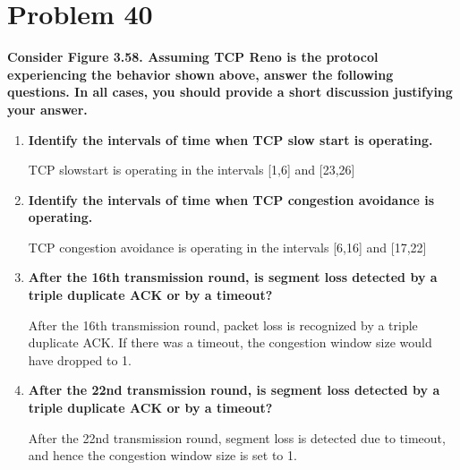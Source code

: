 \documentclass[11pt]{article}
\newenvironment{qparts}{\begin{enumerate}[{(}a{)}]}{\end{enumerate}}
\begin{document}
\newpage
\section{Problem 40}

\textbf{Consider Figure 3.58. Assuming TCP Reno is the protocol experiencing the behavior shown above, answer the following questions. In all cases, you should provide a short discussion justifying your answer.}

\begin{qparts}
	\item \textbf{Identify the intervals of time when TCP slow start is operating.}

	TCP slowstart is operating in the intervals [1,6] and [23,26]
	
	\item \textbf{Identify the intervals of time when TCP congestion avoidance is operating.}
	
	TCP congestion avoidance is operating in the intervals [6,16] and [17,22]
	
	\item \textbf{After the 16th transmission round, is segment loss detected by a triple duplicate ACK or by a timeout?}
	
	 After the 16th transmission round, packet loss is recognized by a triple duplicate ACK. If there was a timeout, the congestion window size would have dropped to 1.
	
	\item \textbf{After the 22nd transmission round, is segment loss detected by a triple duplicate ACK or by a timeout?}
	
	After the 22nd transmission round, segment loss is detected due to timeout, and hence the congestion window size is set to 1.
	
\end{qparts}
\end{document}

